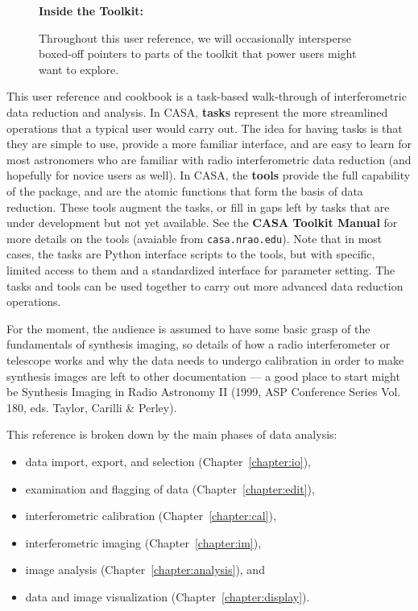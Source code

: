 \begin{wrapfigure}{r}{2.5in}
  \begin{boxedminipage}{2.5in}
     \centerline{\bf Inside the Toolkit:}
     Throughout this user reference, we will occasionally intersperse
     boxed-off pointers to parts of the toolkit that power users might
     want to explore.  
  \end{boxedminipage}
\end{wrapfigure}

This user reference and cookbook is a task-based walk-through of
interferometric data reduction and analysis. In CASA, {\bf tasks}
represent the more streamlined operations that a typical user would
carry out. The idea for having tasks is that they are simple to use,
provide a more familiar interface, and are easy to learn for most
astronomers who are familiar with radio interferometric data reduction
(and hopefully for novice users as well). In CASA, the {\bf tools}
provide the full capability of the package, and are the atomic
functions that form the basis of data reduction.  These tools augment
the tasks, or fill in gaps left by tasks that are under development
but not yet available. See the {\bf CASA Toolkit Manual} for more
details on the tools (avaiable from \verb=casa.nrao.edu=).  Note that
in most cases, the tasks are Python interface scripts to the tools,
but with specific, limited access to them and a standardized interface
for parameter setting.  The tasks and tools can be used together to
carry out more advanced data reduction operations.

For the moment, the audience is assumed to have some basic grasp of
the fundamentals of synthesis imaging, so details of how a radio
interferometer or telescope works and why the data needs to undergo
calibration in order to make synthesis images are left to other
documentation --- a good place to start might be Synthesis Imaging in
Radio Astronomy II (1999, ASP Conference Series Vol. 180, eds. Taylor,
Carilli \& Perley).

This reference is broken down by the main phases of data analysis:
\begin{itemize}
   \item data import, export, and selection (Chapter~\ref{chapter:io}),

   \item examination and flagging of data (Chapter~\ref{chapter:edit}),

   \item interferometric calibration (Chapter~\ref{chapter:cal}),

   \item interferometric imaging (Chapter~\ref{chapter:im}),

   \item image analysis (Chapter~\ref{chapter:analysis}), and

   \item data and image visualization (Chapter~\ref{chapter:display}).

\end{itemize}

